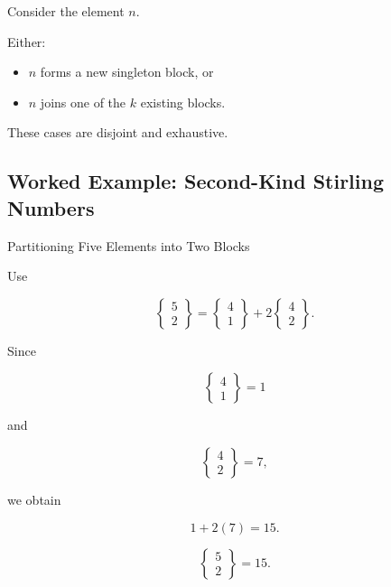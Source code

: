 Consider the element \(n\).

Either:

\begin{itemize}
    \item \(n\) forms a new singleton block, or
    \item \(n\) joins one of the \(k\) existing blocks.
\end{itemize}

These cases are disjoint and exhaustive.

\subsection{Worked Example: Second-Kind Stirling Numbers}
\label{subsec:worked-stirling-second}

\begin{workedexamplebox}{Partitioning Five Elements into Two Blocks}

Use

\[
\left\{
\begin{matrix}
5\\
2
\end{matrix}
\right\}
=
\left\{
\begin{matrix}
4\\
1
\end{matrix}
\right\}
+
2
\left\{
\begin{matrix}
4\\
2
\end{matrix}
\right\}.
\]

Since

\[
\left\{
\begin{matrix}
4\\
1
\end{matrix}
\right\}
=1
\]

and

\[
\left\{
\begin{matrix}
4\\
2
\end{matrix}
\right\}
=7,
\]

we obtain

\[
1+2(7)=15.
\]

\begin{answerbox}
\[
\boxed{
\left\{
\begin{matrix}
5\\
2
\end{matrix}
\right\}
=
15.
}
\]
\end{answerbox}

\end{workedexamplebox}

